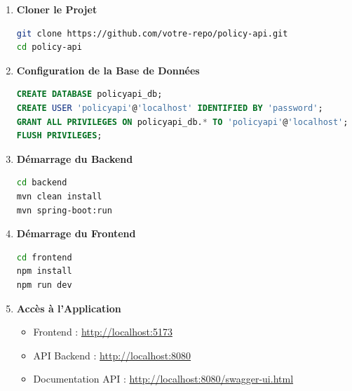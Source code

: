\documentclass[12pt,a4paper]{article}
\begin{document}
\begin{enumerate}
\item \textbf{Cloner le Projet}
\begin{lstlisting}[language=bash]
git clone https://github.com/votre-repo/policy-api.git
cd policy-api
\end{lstlisting}

\item \textbf{Configuration de la Base de Données}
\begin{lstlisting}[language=sql]
CREATE DATABASE policyapi_db;
CREATE USER 'policyapi'@'localhost' IDENTIFIED BY 'password';
GRANT ALL PRIVILEGES ON policyapi_db.* TO 'policyapi'@'localhost';
FLUSH PRIVILEGES;
\end{lstlisting}

\item \textbf{Démarrage du Backend}
\begin{lstlisting}[language=bash]
cd backend
mvn clean install
mvn spring-boot:run
\end{lstlisting}

\item \textbf{Démarrage du Frontend}
\begin{lstlisting}[language=bash]
cd frontend
npm install
npm run dev
\end{lstlisting}

\item \textbf{Accès à l'Application}
\begin{itemize}
\item Frontend : \url{http://localhost:5173}
\item API Backend : \url{http://localhost:8080}
\item Documentation API : \url{http://localhost:8080/swagger-ui.html}
\end{itemize}
\end{enumerate}
\end{document}
